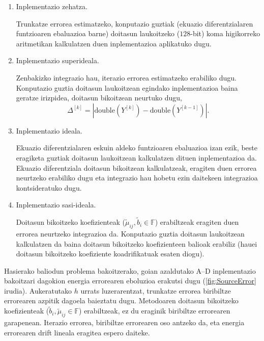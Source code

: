 \begin{enumerate}
\renewcommand{\theenumi}{\Alph{enumi}}

\item Inplementazio zehatza.

Trunkatze errorea estimatzeko, konputazio guztiak (ekuazio diferentzialaren funtzioaren ebaluazioa barne) doitasun laukoitzeko ($128$-bit) koma higikorreko aritmetikan kalkulatzen duen inplementazioa aplikatuko dugu. 


\item Inplementazio superideala.

Zenbakizko integrazio hau, iterazio errorea estimatzeko erabiliko dugu. Konputazio guztia doitasun laukoitzean egindako inplementazioa baina geratze irizpidea, doitasun bikoitzean neurtuko dugu,
\begin{equation*}
\Delta^{[k]}=|\text{double}(Y^{[k]})-\text{double}(Y^{[k-1]})|.
\end{equation*}

\item Inplementazio ideala.

Ekuazio diferentzialaren eskuin aldeko funtzioaren ebaluazioa izan ezik, beste eragiketa guztiak doitasun laukoitzean kalkulatzen dituen inplementazioa da. Ekuazio diferentziala doitasun bikoitzean kalkulatzeak, eragiten duen errorea neurtzeko erabiliko dugu eta integrazio hau hobetu ezin daitekeen integrazioa kontsideratuko dugu.  

\item Inplementazio sasi-ideala.

Doitasun bikoitzeko koefizienteak ($\tilde{\mu}_{ij},\tilde{b}_i \in \mathbb{F}$) erabiltzeak eragiten duen errorea neurtzeko integrazioa da. Konputazio guztia doitasun laukoitzean kalkulatzen da baina doitasun bikoitzeko koefizienteen balioak erabiliz (hauei doitasun bikoitzeko koefiziente koadrifikatuak esaten diogu). 

\end{enumerate}


Hasierako baliodun problema bakoitzerako, goian azaldutako A--D inplementazio bakoitzari dagokion energia errorearen eboluzioa erakutsi dugu (\ref{fig:SourceError} irudia). Aukeratutako $h$ urrats luzerarentzat, trunkatze errorea biribiltze errorearen azpitik dagoela baieztatu dugu.
Metodoaren doitasun bikoitzeko koefizienteak ($\tilde{b}_i, \tilde{\mu}_{ij}\in \mathbb{F}$) erabiltzeak, ez du eraginik biribiltze errorearen garapenean.  Iterazio errorea, biribiltze errorearen oso antzeko da, eta energia errorearen drift lineala eragitea espero daiteke. 

